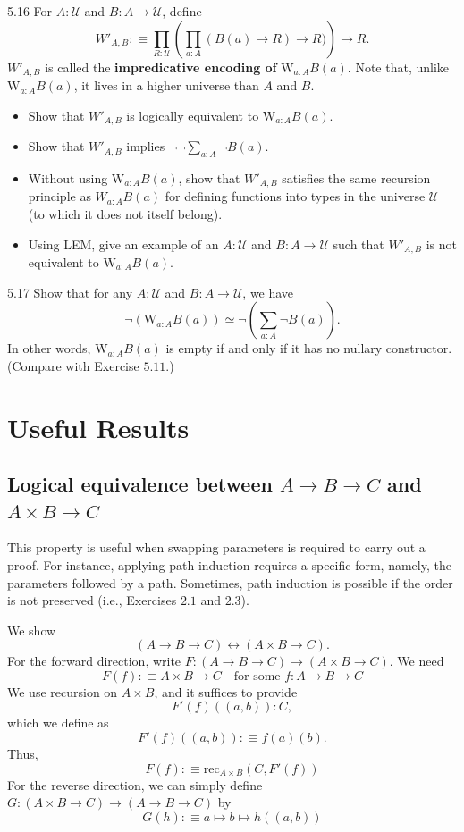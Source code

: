\documentclass[14pt]{extarticle}
\newcommand{\0}{{\mathbf 0}}
\newcommand{\1}{{\mathbf 1}}
\newcommand{\2}{{\mathbf 2}}
\newcommand{\UU}{{\mathcal U}}
\newcommand{\mt}{\mapsto}
\newcommand{\rec}{\mathrm{rec}}
\newcommand{\W}{\mathrm{W}}
\begin{document}
\begin{prob}{5.16}{} For $A : \UU$ and $B : A \to \UU$, define \[W'_{A,B} : \equiv \prod_{R : \UU}\left(\prod_{a:A} (B(a) \to R) \to R) \right) \to R.\] $W'_{A,B}$ is called the \textbf{impredicative encoding of }$\W_{a:A}B(a)$. Note that, unlike $\W_{a:A}B(a)$, it lives in a higher universe than $A$ and $B$.
\begin{itemize}
\item [(i)] Show that $W'_{A,B}$ is logically equivalent to $\W_{a:A}B(a)$.
\item [(ii)] Show that $W'_{A,B}$ implies $\neg \neg \sum_{a:A} \neg B(a)$.
\item [(iii)] Without using $\W_{a:A}B(a)$, show that $W'_{A,B}$ satisfies the same recursion principle as $W_{a:A}B(a)$ for defining functions into types in the universe $\UU$ (to which it does not itself belong).
\item [(iv)] Using LEM, give an example of an $A : \UU$ and $B : A \to \UU$ such that $W'_{A,B}$ is not equivalent to $\W_{a:A}B(a)$.
\end{itemize}
\end{prob}

\begin{prob}{5.17}{} Show that for any $A : \UU$ and $B : A \to \UU$, we have \[\neg \left(\W_{a:A}B(a) \right) \simeq \neg \left(\sum_{a:A} \neg B(a) \right).\] In other words, $\W_{a:A}B(a)$ is empty if and only if it has no nullary constructor. (Compare with Exercise $5.11$.)
\end{prob}


\section*{Useful Results}
\subsection*{Logical equivalence between $A \to B \to C$ and $A \times B \to C$}
This property is useful when swapping parameters is required to carry out a proof. For instance, applying path induction requires a specific form, namely, the parameters followed by a path. Sometimes, path induction is possible if the order is not preserved (i.e., Exercises $2.1$ and $2.3$).

We show \[(A \to B \to C) \leftrightarrow (A \times B \to C).\]
For the forward direction, write $F : (A \to B \to C) \rightarrow (A \times B \to C)$. We need
\[F(f) :\equiv A \times B \to C \quad \text{for some } f : A \to B \to C\] 
We use recursion on $A \times B$, and it suffices to provide
\[F'(f)((a,b)) : C,\] which we define as
\[F'(f)((a,b)) :\equiv f(a)(b).\] Thus,
\[F(f) :\equiv \rec_{A\times B}(C,F'(f))\]
For the reverse direction, we can simply define $G : (A \times B \to C) \to (A \to B \to C)$ by
\[G(h) :\equiv a \mt b \mt h((a,b))\]
\end{document}
